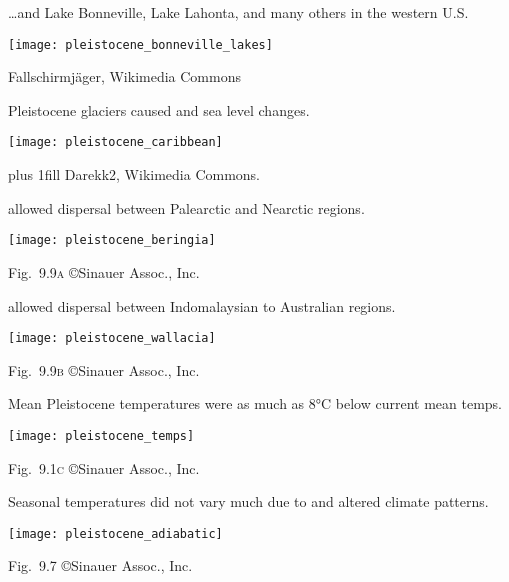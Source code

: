 \documentclass[t]{beamer}
\begin{document}
\begin{frame}{\dots and Lake Bonneville, Lake Lahonta, and many others in the western U.S.}

	\vspace*{-0.5\baselineskip}
	
	{\centering
		\texttt{[image: pleistocene\_bonneville\_lakes]}\par
	}

	\vfilll
	
	\hfill \tiny Fallschirmjäger, Wikimedia Commons 
\end{frame}

\begin{frame}{Pleistocene glaciers caused  and  sea level changes.}
	\vspace{-\baselineskip}
	\begin{center}
		\texttt{[image: pleistocene\_caribbean]}
	\end{center}
	\vskip0pt plus 1fill
	\hfill\tiny Darekk2, Wikimedia Commons.
\end{frame}

\begin{frame}{ allowed dispersal between Palearctic and Nearctic regions.}
		
	\texttt{[image: pleistocene\_beringia]}
	
	\vfilll
	
	\hfill \tiny Fig.~9.9\textsc{a} \copyright Sinauer Assoc., Inc.	
\end{frame}

\begin{frame}{ allowed dispersal between Indomalaysian to Australian regions.}

	\vspace{-0.5\baselineskip}

	{\centering
		\texttt{[image: pleistocene\_wallacia]}\par
	}

	\vfilll

	\hfill \tiny Fig.~9.9\textsc{b} \copyright Sinauer Assoc., Inc.
\end{frame}
%
\begin{frame}{Mean Pleistocene temperatures were as much as 8°C below current mean temps.}

	\texttt{[image: pleistocene\_temps]}

	\vfilll
	
	\hfill \tiny Fig.~9.1\textsc{c} \copyright Sinauer Assoc., Inc.
	
\end{frame}
%
\begin{frame}{Seasonal temperatures did not vary much due to  and altered climate patterns.}

	\texttt{[image: pleistocene\_adiabatic]}

	\hfill \tiny Fig.~9.7 \copyright Sinauer Assoc., Inc.
	
\end{frame}
\end{document}
